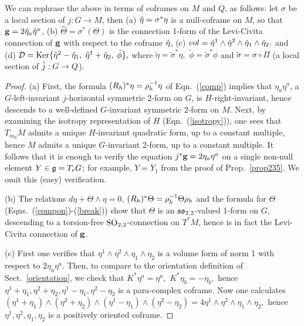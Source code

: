\newcommand{\hT}{\hat\Theta}
\begin{rmrk} We can rephrase the above in terms of coframes on $M$
 and $Q$, as follows: let $\sigma$ be a local section of $j:G\to M$, 
 then (a) $\hat\eta=\sigma^*\eta$ is a null-coframe on $M$, 
 so that $\mathbf{ g}=2\hat\eta_a\hat\eta^a$, 
 (b)  $\hT=\sigma^*(\Theta)$ is the connection 1-form of the 
 Levi-Civita connection of $\mathbf{ g}$ with respect to the coframe $\hat\eta$, 
 (c) $vol=\hat\eta^1\wedge\hat\eta^2\wedge\hat\eta_1\wedge\hat\eta_2.$ and
  (d) ${\mathcal D}={\rm Ker}\{\tilde\eta^2-\tilde\eta_1,\;\tilde\eta^1+\tilde\eta_2, \; \tilde\phi\},$
   where $\tilde\eta=\tilde\sigma^*\eta,$ $\tilde\phi=\tilde\sigma^*\phi $ and $\tilde\sigma= \sigma\circ\Pi$ (a local section of ${\tilde j}:G\to Q$). 
\end{rmrk}
\begin{proof} 
 (a) First,  the formula $(R_h)^*\eta=\rho_h^{-1}\eta$ of Eqn.~(\ref{comp}) implies  that $\eta_a\eta^a$, a $G$-left-invariant $j$-horizontal symmetric 2-form   
 on $G$, is  $H$-right-invariant, hence descends to a 
well-defined $G$-invariant symmetric 2-form on $M.$ Next, by examining the isotropy
 representation of $H$ (Eqn.~(\ref{isotropy})), one sees that $T_{m_0}M$ admits  a unique 
 $H$-invariant quadratic form, up to a constant multiple, hence $M$ admits a unique $G$-invariant 2-form, up to a constant multiple.  It follows that it is enough to verify the equation $j^*\mathbf{ g}=2\eta_a\eta^a$ 
 on a single non-null element $Y\in {\mathfrak{g}}=T_eG$; for example,  $Y=Y_1$ from  the proof of Prop.~\ref{prop235}. We omit this (easy) verification.
  
\mn(b) The relations   $d\eta+\Theta\wedge\eta=0$, $(R_h)^*\Theta=\rho_h^{-1}\Theta\rho_h$  and the formula for $\Theta$
(Eqns.~(\ref{compon})-(\ref{break}))  show  that $\Theta$ is an $\mathfrak{so}_{2,2}$-valued 1-form on $G$, descending to  a torsion-free $\mathrm{SO}_{2,2}$-connection  on $T^*M$, hence  is in fact the Levi-Civita connection of $\mathbf{ g}$. 


\mn(c)  First one verifies that $\eta^1\wedge\eta^2\wedge\eta_1\wedge\eta_2$ is  a volume  form of norm 1 with respect to $2\eta_a\eta^a$. Then, to compare to the orientation definition of Sect.~\ref{orientation}, we check that $K^*\eta^a=\eta^a,$ $K^*\eta_b=-\eta_b,$ hence $\eta^1+\eta_1, \eta^2+\eta_2, \eta^1-\eta_1, \eta^2-\eta_2$ is a para-complex coframe. Now one calculates  $(\eta^1+\eta_1)\wedge(\eta^2+\eta_2)\wedge(\eta^1-\eta_1)\wedge(\eta^2-\eta_2)=4\eta^1\wedge\eta^2\wedge\eta_1\wedge\eta_2,$ hence $\eta^1, \eta^2, \eta_1, \eta_2$ is a positively oriented coframe. 



\end{proof}
